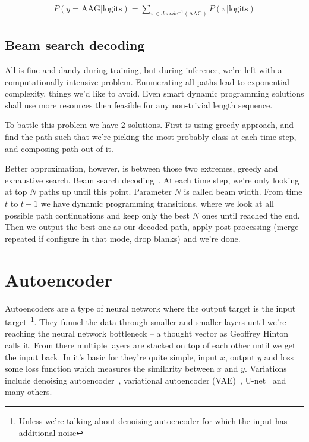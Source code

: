\documentclass[times, utf8, diplomski, english]{fer}
\begin{document}
\begin{equation}
\begin{gathered}
\label{eq:ctc_prob}
P(y = \text{AAG}| \text{logits}) = \sum_{\pi \in decode^{-1}(\text{AAG})} P(\pi | \text{logits})
\end{gathered}
\end{equation}

\subsection{Beam search decoding}
\label{subsec:beam-search}

All is fine and dandy during training, but during inference, we're left with a computationally intensive problem. Enumerating all paths lead to exponential complexity, things we'd like to avoid. Even smart dynamic programming solutions shall use more resources then feasible for any non-trivial length sequence. 

To battle this problem we have 2 solutions. First is using greedy approach, and find the path such that we're picking the most probably class at each time step, and composing path out of it.

Better approximation, however, is between those two extremes, greedy and exhaustive search. Beam search decoding~\cite{graves_decode}. At each time step, we're only looking at top $N$ paths up until this point. Parameter $N$ is called beam width. From time $t$ to $t+1$ we have dynamic programming transitions, where we look at all possible path continuations and keep only the best $N$ ones until reached the end. Then we output the best one as our decoded path, apply post-processing (merge repeated if configure in that mode, drop blanks) and we're done.

\section{Autoencoder}
\label{sec:autoencoder}
Autoencoders are a type of neural network where the output target is the input target~\footnote{Unless we're talking about denoising autoencoder for which the input has additional noise}. They funnel the data through smaller and smaller layers until we're reaching the neural network bottleneck -- a thought vector as Geoffrey Hinton calls it.  From there multiple layers are stacked on top of each other until we get the input back. In it's basic for they're quite simple, input $x$, output $y$ and loss some loss function which measures the similarity between $x$ and $y$. Variations include denoising autoencoder~\citep{vincent2008extracting}, variational autoencoder (VAE)~\citep{kingma2013auto}, U-net~\citep{DBLP:journals/corr/RonnebergerFB15} and many others. 
\end{document}
